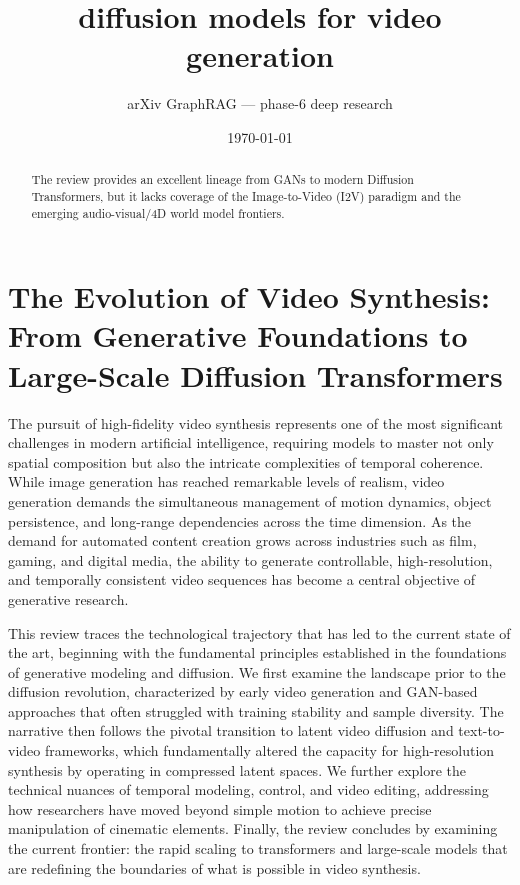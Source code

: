 \documentclass[11pt]{article}
\title{diffusion models for video generation}
\author{arXiv GraphRAG --- phase-6 deep research}
\date{\today}
\begin{document}
\maketitle

\begin{abstract}
The review provides an excellent lineage from GANs to modern Diffusion Transformers, but it lacks coverage of the Image-to-Video (I2V) paradigm and the emerging audio-visual/4D world model frontiers.
\end{abstract}

\section{The Evolution of Video Synthesis: From Generative Foundations to Large-Scale Diffusion Transformers}

The pursuit of high-fidelity video synthesis represents one of the most significant challenges in modern artificial intelligence, requiring models to master not only spatial composition but also the intricate complexities of temporal coherence. While image generation has reached remarkable levels of realism, video generation demands the simultaneous management of motion dynamics, object persistence, and long-range dependencies across the time dimension. As the demand for automated content creation grows across industries such as film, gaming, and digital media, the ability to generate controllable, high-resolution, and temporally consistent video sequences has become a central objective of generative research.

This review traces the technological trajectory that has led to the current state of the art, beginning with the fundamental principles established in the foundations of generative modeling and diffusion. We first examine the landscape prior to the diffusion revolution, characterized by early video generation and GAN-based approaches that often struggled with training stability and sample diversity. The narrative then follows the pivotal transition to latent video diffusion and text-to-video frameworks, which fundamentally altered the capacity for high-resolution synthesis by operating in compressed latent spaces. We further explore the technical nuances of temporal modeling, control, and video editing, addressing how researchers have moved beyond simple motion to achieve precise manipulation of cinematic elements. Finally, the review concludes by examining the current frontier: the rapid scaling to transformers and large-scale models that are redefining the boundaries of what is possible in video synthesis.
\end{document}
